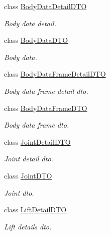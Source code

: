 \begin{DoxyCompactItemize}
\item 
class \mbox{\hyperlink{class_bar_none_1_1_shared_1_1_data_transfer_1_1_body_data_detail_d_t_o}{Body\+Data\+Detail\+D\+TO}}
\begin{DoxyCompactList}\small\item\em Body data detail. \end{DoxyCompactList}\item 
class \mbox{\hyperlink{class_bar_none_1_1_shared_1_1_data_transfer_1_1_body_data_d_t_o}{Body\+Data\+D\+TO}}
\begin{DoxyCompactList}\small\item\em Body data. \end{DoxyCompactList}\item 
class \mbox{\hyperlink{class_bar_none_1_1_shared_1_1_data_transfer_1_1_body_data_frame_detail_d_t_o}{Body\+Data\+Frame\+Detail\+D\+TO}}
\begin{DoxyCompactList}\small\item\em Body data frame detail dto. \end{DoxyCompactList}\item 
class \mbox{\hyperlink{class_bar_none_1_1_shared_1_1_data_transfer_1_1_body_data_frame_d_t_o}{Body\+Data\+Frame\+D\+TO}}
\begin{DoxyCompactList}\small\item\em Body data frame dto. \end{DoxyCompactList}\item 
class \mbox{\hyperlink{class_bar_none_1_1_shared_1_1_data_transfer_1_1_joint_detail_d_t_o}{Joint\+Detail\+D\+TO}}
\begin{DoxyCompactList}\small\item\em Joint detail dto. \end{DoxyCompactList}\item 
class \mbox{\hyperlink{class_bar_none_1_1_shared_1_1_data_transfer_1_1_joint_d_t_o}{Joint\+D\+TO}}
\begin{DoxyCompactList}\small\item\em Joint dto. \end{DoxyCompactList}\item 
class \mbox{\hyperlink{class_bar_none_1_1_shared_1_1_data_transfer_1_1_lift_detail_d_t_o}{Lift\+Detail\+D\+TO}}
\begin{DoxyCompactList}\small\item\em Lift details dto. \end{DoxyCompactList}\item 

\end{DoxyCompactItemize}
